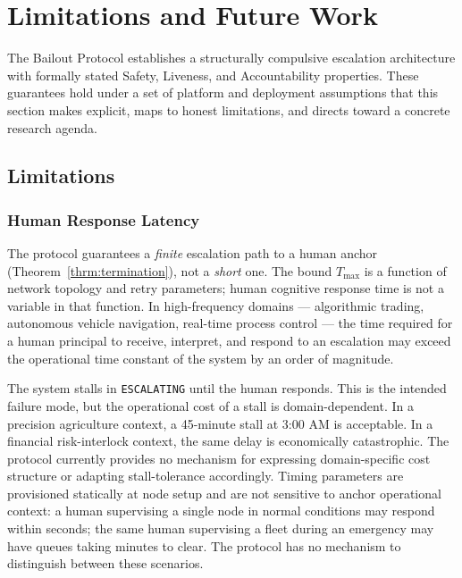 \section{Limitations and Future Work}
\label{sec:limitations-and-future-work}

The Bailout Protocol establishes a structurally compulsive escalation architecture with formally stated Safety, Liveness, and Accountability properties. These guarantees hold under a set of platform and deployment assumptions that this section makes explicit, maps to honest limitations, and directs toward a concrete research agenda.

\subsection{Limitations}
\label{sec:limitations}

\subsubsection{Human Response Latency}
\label{sec:limitations-latency}

The protocol guarantees a \emph{finite} escalation path to a human anchor (Theorem~\ref{thrm:termination}), not a \emph{short} one. The bound $T_{\max}$ is a function of network topology and retry parameters; human cognitive response time is not a variable in that function. In high-frequency domains --- algorithmic trading, autonomous vehicle navigation, real-time process control --- the time required for a human principal to receive, interpret, and respond to an escalation may exceed the operational time constant of the system by an order of magnitude.

The system stalls in \texttt{ESCALATING} until the human responds. This is the intended failure mode, but the operational cost of a stall is domain-dependent. In a precision agriculture context, a 45-minute stall at 3:00 AM is acceptable. In a financial risk-interlock context, the same delay is economically catastrophic. The protocol currently provides no mechanism for expressing domain-specific cost structure or adapting stall-tolerance accordingly. Timing parameters are provisioned statically at node setup and are not sensitive to anchor operational context: a human supervising a single node in normal conditions may respond within seconds; the same human supervising a fleet during an emergency may have queues taking minutes to clear. The protocol has no mechanism to distinguish between these scenarios.

